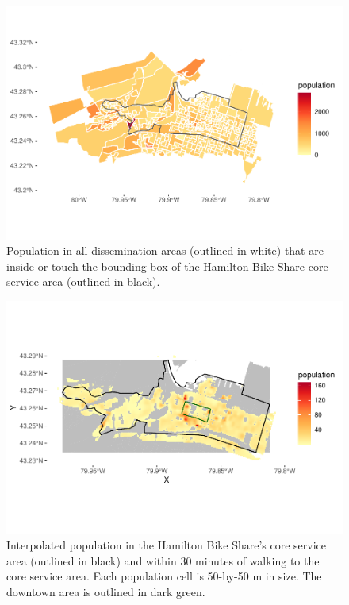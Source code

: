\documentclass[]{elsarticle} %
\begin{document}
\begin{figure}

{\centering \includegraphics[width=0.9\linewidth]{Bike-share-spatial-equity_files/figure-latex/da-population-1} 

}

\caption{Population in all dissemination areas (outlined in white) that are inside or touch the bounding box of the Hamilton Bike Share core service area (outlined in black).}\label{fig:da-population}
\end{figure}

\begin{figure}

{\centering \includegraphics[width=0.9\linewidth]{Bike-share-spatial-equity_files/figure-latex/interpolated-population-1} 

}

\caption{Interpolated population in the Hamilton Bike Share's core service area (outlined in black) and within 30 minutes of walking to the core service area. Each population cell is 50-by-50 m in size. The downtown area is outlined in dark green.}\label{fig:interpolated-population}
\end{figure}
\end{document}
